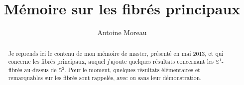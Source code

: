\documentclass[a4paper,10pt]{report}
\title{M\'emoire sur les fibr\'es principaux}
\author{Antoine Moreau}
\begin{document}
\maketitle

\begin{abstract}
Je reprends ici le contenu de mon m\'emoire de master, pr\'esent\'e en mai 2013, et qui concerne les fibr\'es principaux, %
auquel j'ajoute quelques r\'esultats concernant les $\mathbb{S}^1$-fibr\'es au-dessus de $\mathbb{S}^2$. %
Pour le moment, quelques r\'esultats \'el\'ementaires et remarquables sur les fibr\'es sont rappel\'es, avec ou sans leur d\'emonstration.
\end{abstract}




\appendix

%



\end{document}
